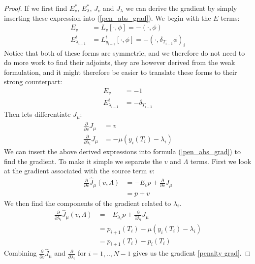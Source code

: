 \begin{proof}
If we first find $E_v^*$, $E_{\lambda}^*$, $J_v$ and $J_{\lambda}$ we can derive the gradient by simply inserting these expression into (\ref{pen_abs_grad}). We begin with the $E$ terms:
\begin{align*}
E_v &= L_v[\cdot,\phi] = -(\cdot,\phi) \\
E_{\lambda_{i-1}}^i &= L_{y_{i-1}}^i[\cdot,\phi] = -(\cdot,\delta_{T_{i-1}}\phi)_i
\end{align*}
Notice that both of these forms are symmetric, and we therefore do not need to do more work to find their adjoints, they are however derived from the weak formulation, and it might therefore be easier to translate these forms to their strong counterpart:
\begin{align*}
E_v &=-1 \\
E_{\lambda_{i-1}}^i &= -\delta_{T_{i-1}}
\end{align*}
Then lets differentiate $ J_{\mu}$:
\begin{align*}
\frac{\partial}{\partial v} J_{\mu} &= v \\
\frac{\partial}{\partial \lambda_i}J_{\mu} &= - \mu (y_{i}(T_i)-\lambda_i)
\end{align*}
We can insert the above derived expressions into formula (\ref{pen_abs_grad}) to find the gradient. To make it simple we separate the $v$ and $\Lambda$ terms. First we look at the gradient associated with the source term $v$:
\begin{align*}
\frac{\partial}{\partial v} \hat J_{\mu}(v,\Lambda) &= -E_vp +  \frac{\partial}{\partial v} J_{\mu} \\
&=p+v
\end{align*}
We then find the components of the gradient related to $\lambda_i$.
\begin{align*}
\frac{\partial}{\partial \lambda_i} \hat J_{\mu}(v,\Lambda) &= -E_{\lambda_i} p +  \frac{\partial}{\partial \lambda_i} J_{\mu} \\
&= p_{i+1}(T_i)-\mu (y_{i}(T_i)-\lambda_i)\\
 &= p_{i+1}(T_i)-p_i(T_i)
\end{align*}
Combining $\frac{\partial}{\partial v} \hat J_{\mu}$ and $ \frac{\partial}{\partial \lambda_i}$ for $i=1,..,N-1$ gives us the gradient \ref{penalty grad}.
\end{proof} 
